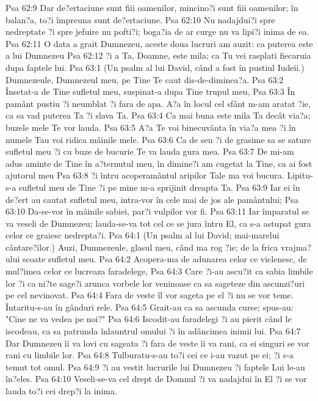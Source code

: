 Psa 62:9  Dar de?ertaciune sunt fiii oamenilor, mincino?i sunt fiii oamenilor; în balan?a, to?i împreuna sunt de?ertaciune.
Psa 62:10  Nu nadajdui?i spre nedreptate ?i spre jefuire nu pofti?i; boga?ia de ar curge nu va lipi?i inima de ea.
Psa 62:11  O data a grait Dumnezeu, aceste doua lucruri am auzit: ca puterea este a lui Dumnezeu
Psa 62:12  ?i a Ta, Doamne, este mila; ca Tu vei rasplati fiecaruia dupa faptele lui.
Psa 63:1  (Un psalm al lui David, când a fost în pustiul Iudeii.) Dumnezeule, Dumnezeul meu, pe Tine Te caut dis-de-diminea?a.
Psa 63:2  Însetat-a de Tine sufletul meu, suspinat-a dupa Tine trupul meu,
Psa 63:3  În pamânt pustiu ?i neumblat ?i fara de apa. A?a în locul cel sfânt m-am aratat ?ie, ca sa vad puterea Ta ?i slava Ta.
Psa 63:4  Ca mai buna este mila Ta decât via?a; buzele mele Te vor lauda.
Psa 63:5  A?a Te voi binecuvânta în via?a mea ?i în numele Tau voi ridica mâinile mele.
Psa 63:6  Ca de seu ?i de grasime sa se sature sufletul meu ?i cu buze de bucurie Te va lauda gura mea.
Psa 63:7  De mi-am adus aminte de Tine în a?ternutul meu, în dimine?i am cugetat la Tine, ca ai fost ajutorul meu
Psa 63:8  ?i întru acoperamântul aripilor Tale ma voi bucura. Lipitu-s-a sufletul meu de Tine ?i pe mine m-a sprijinit dreapta Ta.
Psa 63:9  Iar ei în de?ert au cautat sufletul meu, intra-vor în cele mai de jos ale pamântului;
Psa 63:10  Da-se-vor în mâinile sabiei, par?i vulpilor vor fi.
Psa 63:11  Iar împaratul se va veseli de Dumnezeu; lauda-se-va tot cel ce se jura întru El, ca s-a astupat gura celor ce graiesc nedrepta?i.
Psa 64:1  (Un psalm al lui David; mai-marelui cântare?ilor.) Auzi, Dumnezeule, glasul meu, când ma rog ?ie; de la frica vrajma?ului scoate sufletul meu.
Psa 64:2  Acopera-ma de adunarea celor ce viclenesc, de mul?imea celor ce lucreaza faradelege,
Psa 64:3  Care ?i-au ascu?it ca sabia limbile lor ?i ca ni?te sage?i arunca vorbele lor veninoase ca sa sageteze din ascunzi?uri pe cel nevinovat.
Psa 64:4  Fara de veste îl vor sageta pe el ?i nu se vor teme. Întaritu-s-au în gânduri rele.
Psa 64:5  Grait-au ca sa ascunda curse; spus-au: "Cine ne va vedea pe noi?"
Psa 64:6  Iscodit-au faradelegi ?i au pierit când le iscodeau, ca sa patrunda înlauntrul omului ?i în adâncimea inimii lui.
Psa 64:7  Dar Dumnezeu îi va lovi cu sageata ?i fara de veste îi va rani, ca ei singuri se vor rani cu limbile lor.
Psa 64:8  Tulburatu-s-au to?i cei ce i-au vazut pe ei; ?i s-a temut tot omul.
Psa 64:9  ?i au vestit lucrurile lui Dumnezeu ?i faptele Lui le-au în?eles.
Psa 64:10  Veseli-se-va cel drept de Domnul ?i va nadajdui în El ?i se vor lauda to?i cei drep?i la inima.
